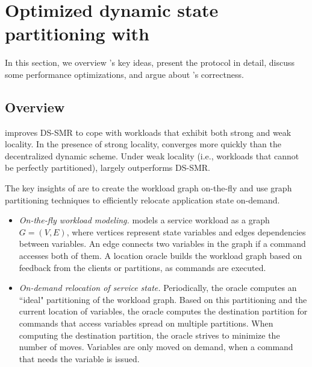 \section{Optimized dynamic state partitioning with \dynastar}
\label{sec:dynastar}

In this section, we overview \dynastar's key ideas, present the protocol in detail, discuss some performance optimizations, and argue about \dynastar's correctness.

\subsection{Overview}

\dynastar improves DS-SMR to cope with workloads that exhibit both strong and weak locality.
In the presence of strong locality, \dynastar converges more quickly than the decentralized dynamic scheme.
Under weak locality (i.e., workloads that cannot be perfectly partitioned), \dynastar largely outperforms DS-SMR.

The key insights of \dynastar are to create the workload graph on-the-fly and use graph partitioning techniques to efficiently relocate application state on-demand.
\begin{itemize}
\item \emph{On-the-fly workload modeling.}
\dynastar models a service workload as a graph $G = (V, E)$, where vertices represent state variables and edges dependencies between variables.
An edge connects two variables in the graph if a command accesses both of them.
A location oracle builds the workload graph based on feedback from the clients or partitions, as commands are executed.
\item \emph{On-demand relocation of service state.}
Periodically, the oracle computes an ``ideal" partitioning of the workload graph.
Based on this partitioning and the current location of variables, the oracle computes the destination partition for commands that access variables spread on multiple partitions.
When computing the destination partition, the oracle strives to minimize the number of moves.
Variables are only moved on demand, when a command that needs the variable is issued.
\end{itemize}




